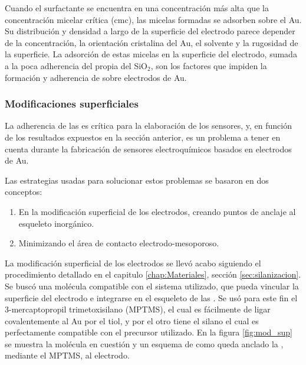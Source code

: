 			Cuando el surfactante se encuentra en una concentración más alta que la concentración micelar crítica (cmc), las micelas formadas se adsorben sobre el Au. Su distribución y densidad a largo de la superficie del electrodo parece depender de la concentración, la orientación cristalina del Au, el solvente y la rugosidad de la superficie\cite{Meena2013,Lim2014}. La adsorción de estas micelas en la superficie del electrodo, sumada a la poca adherencia del propia del SiO$_2$, son los factores que impiden la formación y adherencia de \pdmC\space sobre electrodos de Au.
									
		\subsubsection{Modificaciones superficiales}\label{sec:adherencia}

			La adherencia de las \pdm\space es crítica para la elaboración de los sensores, y, en función de los resultados expuestos en la sección anterior, es un problema a tener en cuenta durante la fabricación de sensores electroquímicos basados en electrodos de Au.

			Las estrategias usadas para solucionar estos problemas se basaron en dos conceptos:
				\begin{enumerate}

					\item En la modificación superficial de los electrodos, creando puntos de anclaje al esqueleto inorgánico.

					\item Minimizando el área de contacto electrodo-mesoporoso.

					\end{enumerate}
			La modificación superficial de los electrodos se llevó acabo siguiendo el procedimiento detallado en el capitulo \ref{chap:Materiales}, sección \ref{sec:silanizacion}. Se buscó una molécula compatible con el sistema utilizado, que pueda vincular la superficie del electrodo e integrarse en el esqueleto de las \pdm. Se usó para este fin el 3-mercaptopropil trimetoxisilano (MPTMS), el cual es fácilmente de ligar covalentemente al Au por el tiol\cite{Gosser}, y por el otro tiene el silano el cual es perfectamente compatible con el precursor utilizado\cite{Wu2014,Wu2013,Chen2011}. En la figura \ref{fig:mod_sup} se muestra la molécula en cuestión y un esquema de como queda anclado la \pdm\space, mediante el MPTMS, al electrodo.
			
